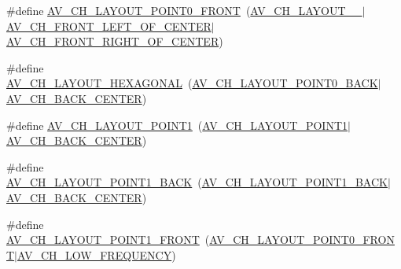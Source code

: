 \begin{DoxyCompactItemize}
\#define \hyperlink{group__channel__mask__c_ga735985d89e38896a0cb9e5a1e96cb9b8}{A\+V\+\_\+\+C\+H\+\_\+\+L\+A\+Y\+O\+U\+T\+\_\+P\+O\+I\+N\+T0\+\_\+\+F\+R\+O\+NT}~(\hyperlink{group__channel__mask__c_ga5c25ee8b976d0cb15e0b6d2cf923d19d}{A\+V\+\_\+\+C\+H\+\_\+\+L\+A\+Y\+O\+U\+T\+\_\+\_}$\vert$\hyperlink{group__channel__masks_ga6c9ea2ea60044bfe844174300b237386}{A\+V\+\_\+\+C\+H\+\_\+\+F\+R\+O\+N\+T\+\_\+\+L\+E\+F\+T\+\_\+\+O\+F\+\_\+\+C\+E\+N\+T\+ER}$\vert$\hyperlink{group__channel__masks_ga558dc25b0ce327d2547d3cc9e4bd6a4e}{A\+V\+\_\+\+C\+H\+\_\+\+F\+R\+O\+N\+T\+\_\+\+R\+I\+G\+H\+T\+\_\+\+O\+F\+\_\+\+C\+E\+N\+T\+ER})
\item 
\#define \hyperlink{group__channel__mask__c_ga44e719835fe17c5af5e619083918d1ca}{A\+V\+\_\+\+C\+H\+\_\+\+L\+A\+Y\+O\+U\+T\+\_\+\+H\+E\+X\+A\+G\+O\+N\+AL}~(\hyperlink{group__channel__mask__c_gab057e9fd36b7e929d000d663badbafc6}{A\+V\+\_\+\+C\+H\+\_\+\+L\+A\+Y\+O\+U\+T\+\_\+P\+O\+I\+N\+T0\+\_\+\+B\+A\+CK}$\vert$\hyperlink{group__channel__masks_ga68650a364e52edb62d5984dddec4f935}{A\+V\+\_\+\+C\+H\+\_\+\+B\+A\+C\+K\+\_\+\+C\+E\+N\+T\+ER})
\item 
\#define \hyperlink{group__channel__mask__c_ga0b63b18f49c294bfbc22afa8b59b6685}{A\+V\+\_\+\+C\+H\+\_\+\+L\+A\+Y\+O\+U\+T\+\_\+P\+O\+I\+N\+T1}~(\hyperlink{group__channel__mask__c_gac36a042dc21866f9043ce930f300d0df}{A\+V\+\_\+\+C\+H\+\_\+\+L\+A\+Y\+O\+U\+T\+\_\+P\+O\+I\+N\+T1}$\vert$\hyperlink{group__channel__masks_ga68650a364e52edb62d5984dddec4f935}{A\+V\+\_\+\+C\+H\+\_\+\+B\+A\+C\+K\+\_\+\+C\+E\+N\+T\+ER})
\item 
\#define \hyperlink{group__channel__mask__c_gaaf1920f827888aeb99540f3ee5a78cea}{A\+V\+\_\+\+C\+H\+\_\+\+L\+A\+Y\+O\+U\+T\+\_\+P\+O\+I\+N\+T1\+\_\+\+B\+A\+CK}~(\hyperlink{group__channel__mask__c_gae9da5d6069701241a22f3af19b152662}{A\+V\+\_\+\+C\+H\+\_\+\+L\+A\+Y\+O\+U\+T\+\_\+P\+O\+I\+N\+T1\+\_\+\+B\+A\+CK}$\vert$\hyperlink{group__channel__masks_ga68650a364e52edb62d5984dddec4f935}{A\+V\+\_\+\+C\+H\+\_\+\+B\+A\+C\+K\+\_\+\+C\+E\+N\+T\+ER})
\item 
\#define \hyperlink{group__channel__mask__c_ga934ec29833f0cbc4a1fe8f97cc914664}{A\+V\+\_\+\+C\+H\+\_\+\+L\+A\+Y\+O\+U\+T\+\_\+P\+O\+I\+N\+T1\+\_\+\+F\+R\+O\+NT}~(\hyperlink{group__channel__mask__c_ga735985d89e38896a0cb9e5a1e96cb9b8}{A\+V\+\_\+\+C\+H\+\_\+\+L\+A\+Y\+O\+U\+T\+\_\+P\+O\+I\+N\+T0\+\_\+\+F\+R\+O\+NT}$\vert$\hyperlink{group__channel__masks_gab19b66e345cf1f9d50ffc26c28862bcc}{A\+V\+\_\+\+C\+H\+\_\+\+L\+O\+W\+\_\+\+F\+R\+E\+Q\+U\+E\+N\+CY})
\item 

\end{DoxyCompactItemize}
